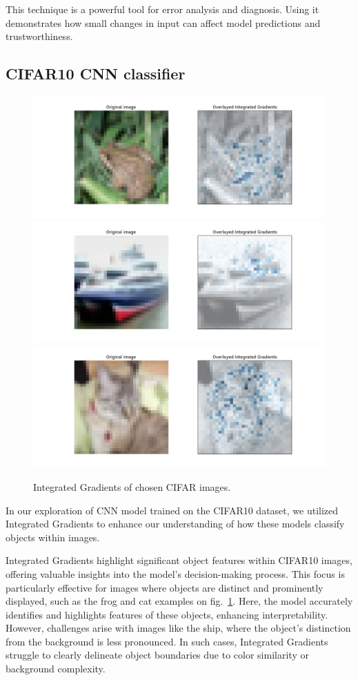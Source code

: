 \documentclass[journal, a4paper]{IEEEtran}
\begin{document}
This technique is a powerful tool for error analysis and diagnosis.
Using it demonstrates how small changes in input can affect model predictions and trustworthiness.

\subsection{CIFAR10 CNN classifier}\label{subsec:experiment-cifar}

\begin{figure}[ht]\centering
    \includegraphics[width=.6\linewidth]{img/integrated_grad/cifar_CNN/frog}
    \includegraphics[width=.6\linewidth]{img/integrated_grad/cifar_CNN/ship}
    \includegraphics[width=.6\linewidth]{img/integrated_grad/cifar_CNN/cat2}
    \caption{Integrated Gradients of chosen CIFAR images.}\label{fig:cifar-cnn-int-grad}
\end{figure}
In our exploration of CNN model trained on the CIFAR10 dataset, we utilized Integrated Gradients to enhance our understanding of how these models classify objects within images.

Integrated Gradients highlight significant object features within CIFAR10 images, offering valuable insights into the model's decision-making process.
This focus is particularly effective for images where objects are distinct and prominently displayed, such as the frog and cat examples on fig.~\ref{fig:cifar-cnn-int-grad}.
Here, the model accurately identifies and highlights features of these objects, enhancing interpretability.
However, challenges arise with images like the ship, where the object’s distinction from the background is less pronounced.
In such cases, Integrated Gradients struggle to clearly delineate object boundaries due to color similarity or background complexity.
\end{document}
